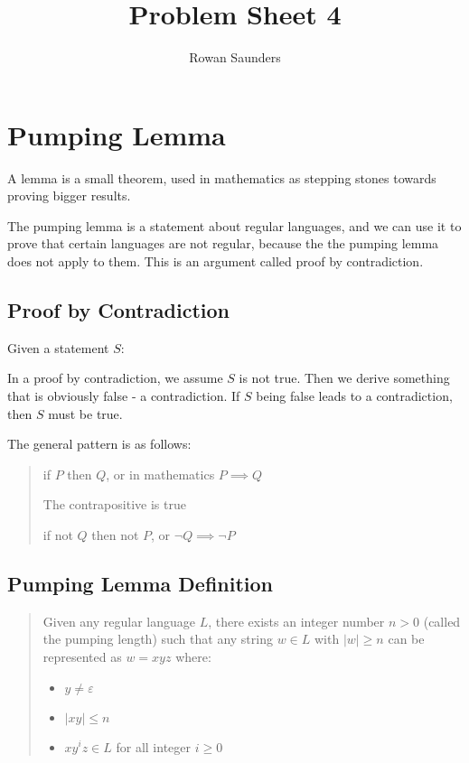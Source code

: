 \documentclass[11pt]{article}
\title{Problem Sheet 4}
\author{Rowan Saunders}
\begin{document}
\begin{titlepage}
	\maketitle
\end{titlepage}

\section{Pumping Lemma}
A lemma is a small theorem, used in mathematics as stepping stones towards
proving bigger results.

The pumping lemma is a statement about regular languages, and we can use it to
prove that certain languages are not regular, because the the pumping lemma does
not apply to them. This is an argument called proof by contradiction.

\subsection{Proof by Contradiction}
Given a statement $S$:

In a proof by contradiction, we assume $S$ is not true. Then we derive something
that is obviously false - a contradiction.
If $S$ being false leads to a contradiction, then $S$ must be true.

The general pattern is as follows:
\begin{quote}
	if $P$ then $Q$, or in mathematics $P \implies Q$

	The contrapositive is true

	if not $Q$ then not $P$, or $\neg Q \implies \neg P$
\end{quote}


\subsection{Pumping Lemma Definition}
\begin{quote}
	Given any regular language $L$, there exists an integer number $n > 0$ (called
	the pumping length) such that any string $w \in L$ with $|w| \geq n$ can be
	represented as $w = x y z$ where:
	\begin{itemize}
		\item $y \neq \varepsilon$
		\item $|xy| \leq n$
		\item $xy^iz \in L$ for all integer $i \geq 0$
	\end{itemize}
\end{quote}
\end{document}
